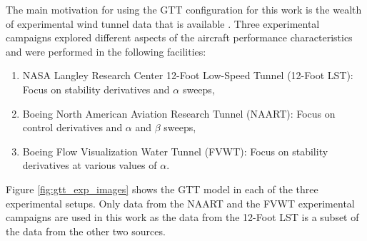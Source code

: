 The main motivation for using the GTT configuration for this work is the wealth of experimental wind tunnel data that is available \cite{cunningham_generic_2018,cunningham_preliminary_2018}. 
Three experimental campaigns explored different aspects of the aircraft performance characteristics and were performed in the following facilities:
\begin{enumerate}
    \item NASA Langley Research Center 12-Foot Low-Speed Tunnel (12-Foot LST): Focus on stability derivatives and $\alpha$ sweeps,
    \item Boeing North American Aviation Research Tunnel (NAART): Focus on control derivatives and $\alpha$ and $\beta$ sweeps,
    \item Boeing Flow Visualization Water Tunnel (FVWT): Focus on stability derivatives at various values of $\alpha$.
\end{enumerate}
Figure \ref{fig:gtt_exp_images} shows the GTT model in each of the three experimental setups.
Only data from the NAART and the FVWT experimental campaigns are used in this work as the data from the 12-Foot LST is a subset of the data from the other two sources. 

